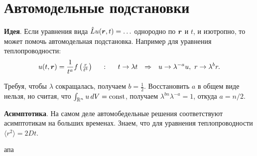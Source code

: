 \section{Автомодельные подстановки}

\textbf{Идея}. 
Если уравнения вида $\hat{L} u(\mbox{\boldmath $r$}, t) = \ldots$ однородно по $\mbox{\boldmath $r$}$ и $t$, и изотропно, то может помочь автомодельная подстановка. Например для уравнения теплопроводности:
\begin{equation*}
	u(t, \mbox{\boldmath $r$}) = \frac{1}{t^a} f\left(\tfrac{r}{t^b}\right)
	\hspace{5 mm} \colon \hspace{5 mm} 
	t \to \lambda t
	\hspace{0.25cm} \Rightarrow \hspace{0.25cm}
	u \to \lambda^{-a} u, \ r \to \lambda^{b} r.
\end{equation*}

Требуя, чтобы $\lambda$ сокращалась, получаем $b = \frac{1}{2}$. 
Восстановить $a$ в общем виде нельзя, но считая, что $\int_{\mathbb{R}^n} u \, d V = \textnormal{const}$, получаем $\lambda^{bn} \lambda^{-a} = 1$, откуда $a = n/2$. 


\textbf{Асимптотика}. 
На самом деле автомобедельные решения соответствуют асимптотикам на больших временах. Знаем, что для уравнения теплопроводности $\langle r^2\rangle = 2 D t$. 


апа
